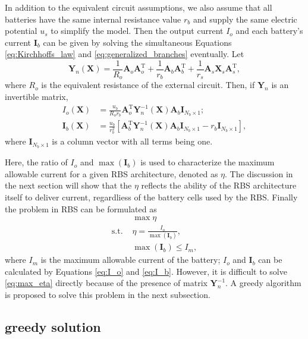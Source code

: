\documentclass{article}
\def\T{\mathrm{T}}
\begin{document}
In addition to the equivalent circuit assumptions, we also assume that all batteries have the same internal resistance value $r_b$ and supply the same electric potential $u_s$ to simplify the model.
Then the output current $I_o$ and each battery's current $\bm{I}_b$ can be given by solving the simultaneous Equations \ref{eq:Kirchhoffs_law} and \ref{eq:generalized_branches} eventually.
Let
\begin{equation}\label{eq:Yn}
    \bm{Y}_n (\bm{X}) = \frac{1}{R_o} \bm{A}_o\bm{A}_o^\T + \frac{1}{r_b} \bm{A}_b\bm{A}_b^\T + \frac{1}{r_s}\bm{A}_s\bm{X}_s\bm{A}_s^\T,
\end{equation}
where $R_o$ is the equivalent resistance of the external circuit.
Then, if $\bm{Y}_n$ is an invertible matrix,
\begin{align}
    I_o(\bm{X})      & = \frac{u_b}{R_o r_b} \bm{A}_o^\T \bm{Y}_n^{-1}(\bm{X}) \bm{A}_b \bm{I}_{N_b\times 1};\label{eq:I_o}\\
    \bm{I}_b(\bm{X}) & = \frac{u_b}{r_b^2}[\bm{A}_b^\T \bm{Y}_n^{-1}(\bm{X}) \bm{A}_b\bm{I}_{N_b \times 1}  -r_b \bm{I}_{N_b \times 1}],\label{eq:I_b}
\end{align}
where $\bm{I}_{N_b\times 1}$ is a column vector with all terms being one.


Here, the ratio of $I_o$ and $\max (\bm{I}_b)$ is used to characterize the maximum allowable current for a given RBS architecture, denoted as $\eta$.
The discussion in the next section will show that the $\eta$ reflects the ability of the RBS architecture itself to deliver current, regardliess of the battery cells used by the RBS.
Finally the problem in RBS can be formulated as
\begin{align}
    & \max \eta \label{eq:max_eta}\\
    \mathrm{s.t.}\,\, & \eta = \frac{I_o}{\max (\bm{I}_b)}, \\
    & \max (\bm{I}_b) \leq I_m,
\end{align}
where $I_m$ is the maximum allowable current of the battery; $I_o$ and $\bm{I}_b$ can be calculated by Equations \ref{eq:I_o} and \ref{eq:I_b}.
However, it is difficult to solve \ref{eq:max_eta} directly because of the presence of matrix $\bm{Y}_n^{-1}$.
A greedy algorithm is proposed to solve this problem in the next subsection.


\subsection{greedy solution}
\end{document}
